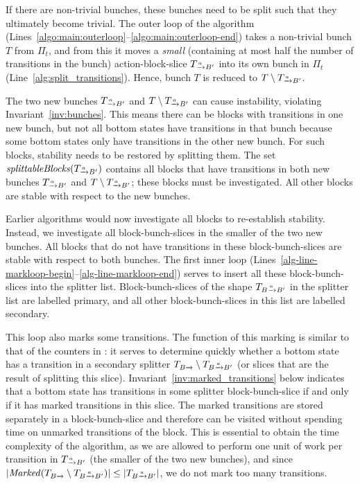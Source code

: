 \documentclass[a4paper,10pt]{article}
\theoremstyle{definition}
\theoremstyle{plain}
\newcommand{\pijl}[1]{\mathrel{\text{$\xrightarrow{\smash[t]{#1}}$}}}
\newcommand{\size}[1]{\left\lvert #1 \right\rvert}
\newcommand{\TB}{T_{B\pijl{}}}
\newcommand{\TBaB}{T_{B\pijl{a} B'}}
\newcommand{\TaB}{T_{\pijl{a} B'}}
\newcommand{\Marked}{\mathit{Marked}}
\newcommand{\splittableBlocks}{\mathit{splittableBlocks}}
\begin{document}
If there are non-trivial bunches,
these bunches need to be split such that they ultimately become trivial.
The outer loop of the algorithm (Lines~\ref{algo:main:outerloop}--\ref{algo:main:outerloop-end}) takes a non-trivial bunch $T$ from $\Pi_t$,
and from this it moves a \emph{small} (containing at most half the number of transitions in the bunch) action-block-slice $\TaB$
into its own bunch in $\Pi_t$ (Line~\ref{alg:split_transitions}).
Hence, bunch $T$ is reduced to $T\setminus \TaB$.

The two new bunches $\TaB$ and $T\setminus \TaB$ can cause instability, violating Invariant~\ref{inv:bunches}.
This means there can be blocks with transitions in one new bunch,
but not all bottom states have transitions in that bunch
because some bottom states only have transitions in the other new bunch.
For such blocks, stability needs to be restored by splitting them.
The set $\splittableBlocks(\TaB)$ contains all blocks that have transitions in both new bunches $\TaB$ and $T\setminus \TaB$;
these blocks must be investigated.
All other blocks are stable with respect to the new bunches.

Earlier algorithms would now investigate all blocks to re-establish stability.
Instead, we investigate all block-bunch-slices in the smaller of the two new bunches. All blocks that do not have transitions in these block-bunch-slices are stable with respect to both bunches.
The first inner loop (Lines~\ref{alg-line-markloop-begin}--\ref{alg-line-markloop-end})
serves to insert all these block-bunch-slices into the splitter list.
Block-bunch-slices of the shape $\TBaB$ in the splitter list are labelled primary,
and all other block-bunch-slices in this list are labelled secondary.

This loop also marks some transitions.
The function of this marking is similar to that of the counters in \cite{PT87}:
it serves to determine quickly whether a bottom state has a transition in a secondary splitter $\TB \setminus \TBaB$
(or slices that are the result of splitting this slice).
Invariant~\ref{inv:marked_transitions} below indicates
that a bottom state has transitions in some splitter block-bunch-slice
if and only if it has marked transitions in this slice.
The marked transitions are stored separately in a block-bunch-slice
and therefore can be visited without spending time on unmarked transitions of the block.
This is essential to obtain the time complexity of the algorithm,
as we are allowed to perform one unit of work per transition in $\TaB$
(the smaller of the two new bunches),
and since $\size{\Marked(\TB \setminus \TBaB)} \leq \size{\TBaB}$, we do not mark too many transitions.
\end{document}
